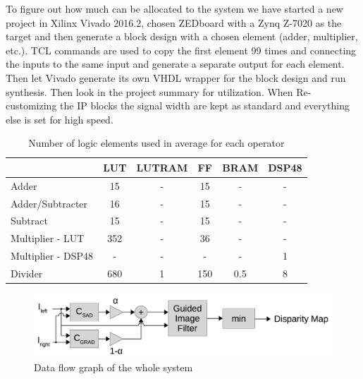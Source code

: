  To figure out how much can be allocated to the system we have started a new project in Xilinx Vivado 2016.2, chosen ZEDboard with a Zynq Z-7020 as the target and then generate a block design with a chosen element (adder, multiplier, etc.). TCL commands are used to copy the first element 99 times and connecting the inputs to the same input and generate a separate output for each element. Then let Vivado generate its own VHDL wrapper for the block design and run synthesis. Then look in the project summary for utilization. When Re-customizing the IP blocks the signal width are kept as standard and everything else is set for high speed. \\  
\begin{table}[ht!]
\centering
\begin{tabular}{l | c c c c c }
  \toprule
   &  LUT & LUTRAM & FF & BRAM & DSP48 \\
  \midrule
  Adder & 15 & - & 15 & - & - \\
  Adder/Subtracter  & 16 & - & 15 & - & - \\
  Subtract  & 15 & - & 15 & - & - \\
  Multiplier - LUT  & 352 & - & 36 & - & - \\
  Multiplier - DSP48 & - & - & - & - & 1 \\
  Divider & 680 & 1 & 150 & 0.5 & 8 \\
  \bottomrule
\end{tabular}
\caption{Number of logic elements used in average for each operator}
\label{tab:utilizationofelements}
\end{table}

\newpage
\begin{figure}[ht!]
  \centering
  \includegraphics[scale=0.3]{figures/whole_system}
  \caption{Data flow graph of the whole system}
  \label{fig:whole_system}
\end{figure}

